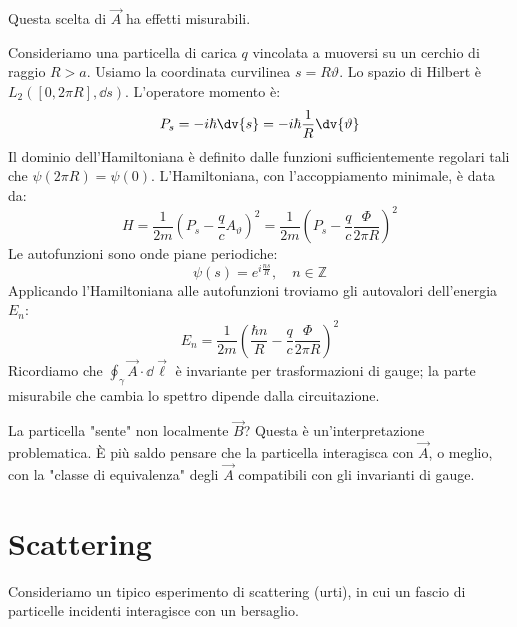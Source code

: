 Questa scelta di \( \vec{A} \) ha effetti misurabili.
\begin{example}
    Consideriamo una particella di carica \( q \) vincolata a muoversi su un cerchio di raggio \( R > a \).
    Usiamo la coordinata curvilinea \( s = R\vartheta \). Lo spazio di Hilbert è \( L_2([0, 2\pi R], \dd{s}) \).
    L'operatore momento è:
    \[
        P_s = -i\hbar \dv{s} = -i\hbar \frac{1}{R} \dv{\vartheta}
    \]
    Il dominio dell'Hamiltoniana è definito dalle funzioni sufficientemente regolari tali che \( \psi(2\pi R) = \psi(0) \).
    L'Hamiltoniana, con l'accoppiamento minimale, è data da:
    \[
        H = \frac{1}{2m} \left( P_s - \frac{q}{c} A_\vartheta \right)^2 = \frac{1}{2m} \left( P_s - \frac{q}{c} \frac{\Phi}{2\pi R} \right)^2
    \]
    Le autofunzioni sono onde piane periodiche:
    \[
        \psi(s) = e^{i \frac{n s}{R}}, \quad n \in \mathbb{Z}
    \]
    Applicando l'Hamiltoniana alle autofunzioni troviamo gli autovalori dell'energia \( E_n \):
    \[
        E_n = \frac{1}{2m} \left( \frac{\hbar n}{R} - \frac{q}{c} \frac{\Phi}{2\pi R} \right)^2
    \]
    Ricordiamo che \( \oint_\gamma \vec{A} \cdot \dd{\vec{\ell}} \) è invariante per trasformazioni di gauge; la parte misurabile che cambia lo spettro dipende dalla circuitazione.

\end{example} 
\begin{remark}
    La particella "sente" non localmente \( \vec{B} \)? Questa è un'interpretazione problematica.
    È più saldo pensare che la particella interagisca con \( \vec{A} \), o meglio, con la "classe di equivalenza" degli \( \vec{A} \) compatibili con gli invarianti di gauge.
\end{remark}



\section{Scattering}

Consideriamo un tipico esperimento di scattering (urti), in cui un fascio di particelle incidenti interagisce con un bersaglio.

\begin{center}
\end{center}

